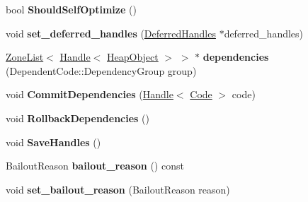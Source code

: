 \begin{DoxyCompactItemize}
\item 
\hypertarget{classv8_1_1internal_1_1_compilation_info_a3a2d1b5893b3341ab37f1cc7b043bb7b}{}bool {\bfseries Should\+Self\+Optimize} ()\label{classv8_1_1internal_1_1_compilation_info_a3a2d1b5893b3341ab37f1cc7b043bb7b}

\item 
\hypertarget{classv8_1_1internal_1_1_compilation_info_af28c1f04691ebb55c5d6bd6e963bf073}{}void {\bfseries set\+\_\+deferred\+\_\+handles} (\hyperlink{classv8_1_1internal_1_1_deferred_handles}{Deferred\+Handles} $\ast$deferred\+\_\+handles)\label{classv8_1_1internal_1_1_compilation_info_af28c1f04691ebb55c5d6bd6e963bf073}

\item 
\hypertarget{classv8_1_1internal_1_1_compilation_info_a6484bfbe03f779d96b0822169557e3e8}{}\hyperlink{classv8_1_1internal_1_1_zone_list}{Zone\+List}$<$ \hyperlink{classv8_1_1internal_1_1_handle}{Handle}$<$ \hyperlink{classv8_1_1internal_1_1_heap_object}{Heap\+Object} $>$ $>$ $\ast$ {\bfseries dependencies} (Dependent\+Code\+::\+Dependency\+Group group)\label{classv8_1_1internal_1_1_compilation_info_a6484bfbe03f779d96b0822169557e3e8}

\item 
\hypertarget{classv8_1_1internal_1_1_compilation_info_aa209a03c7483c8e687b01ecc9a7f6708}{}void {\bfseries Commit\+Dependencies} (\hyperlink{classv8_1_1internal_1_1_handle}{Handle}$<$ \hyperlink{classv8_1_1internal_1_1_code}{Code} $>$ code)\label{classv8_1_1internal_1_1_compilation_info_aa209a03c7483c8e687b01ecc9a7f6708}

\item 
\hypertarget{classv8_1_1internal_1_1_compilation_info_abbe1aeabc7b7cc4d1a31f3ce7a23a821}{}void {\bfseries Rollback\+Dependencies} ()\label{classv8_1_1internal_1_1_compilation_info_abbe1aeabc7b7cc4d1a31f3ce7a23a821}

\item 
\hypertarget{classv8_1_1internal_1_1_compilation_info_a821bbecb736b27cc6838b89c111f5ee3}{}void {\bfseries Save\+Handles} ()\label{classv8_1_1internal_1_1_compilation_info_a821bbecb736b27cc6838b89c111f5ee3}

\item 
\hypertarget{classv8_1_1internal_1_1_compilation_info_ac77f6aea1c883a9653919a977d8474f1}{}Bailout\+Reason {\bfseries bailout\+\_\+reason} () const \label{classv8_1_1internal_1_1_compilation_info_ac77f6aea1c883a9653919a977d8474f1}

\item 
\hypertarget{classv8_1_1internal_1_1_compilation_info_a17751b019514d5445706508c5bc038f6}{}void {\bfseries set\+\_\+bailout\+\_\+reason} (Bailout\+Reason reason)\label{classv8_1_1internal_1_1_compilation_info_a17751b019514d5445706508c5bc038f6}


\end{DoxyCompactItemize}
